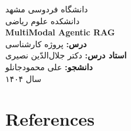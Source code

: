 \documentclass[12pt,a4paper]{article}
\newcommand{\LTRSection}[1]{%
    \LTR\section{\textsf{#1}}
}
\begin{document}
\thispagestyle{empty}
\begin{center}
    \vspace*{2cm}
    \Huge{دانشگاه فردوسی مشهد} \\[0.5cm]
    \Large{دانشکده علوم ریاضی} \\[2cm]
    \Huge{\LTR\textbf{MultiModal Agentic RAG}} \\[2cm]
    \Large{
        \textbf{درس:} پروژه کارشناسی \\
        \textbf{استاد درس:} دکتر جلال‌الدّین نصیری
    } \\[2cm]
    \Large{
        \textbf{دانشجو:} علی محمودجانلو
    } \\[3cm]
    \Large{سال ۱۴۰۴}
\end{center}

\newpage

\thispagestyle{empty}
\hypersetup{linkcolor=blue}
\tableofcontents
\newpage



\newpage


\newpage


\newpage


\newpage
\LTRSection{References}
\begin{thebibliography}{10}
\end{thebibliography}
\end{document}
